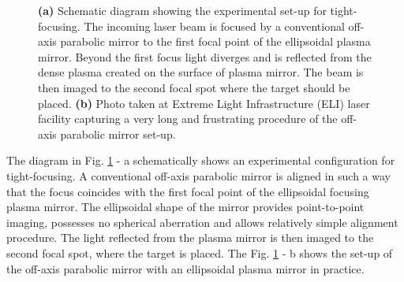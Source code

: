 \begin{figure}[h!]
	\centering
	\hspace{5mm}
	\caption{\textbf{(a)} Schematic diagram showing the experimental set-up for tight-focusing. The incoming laser beam is focused by a conventional off-axis parabolic mirror to the first focal point of the ellipsoidal plasma mirror. Beyond the first focus light diverges and is reflected from the dense plasma created on the surface of plasma mirror. The beam is then imaged to the second focal spot where the target should be placed. \textbf{(b)} Photo taken at Extreme Light Infrastructure (ELI) laser facility capturing a very long and frustrating procedure of the off-axis parabolic mirror set-up.}
	\label{fig:9}
\end{figure}

The diagram in Fig. \ref{fig:9} - a schematically shows an experimental configuration for tight-focusing. A conventional off-axis parabolic mirror is aligned in such a way that the focus coincides with the first focal point of the ellipsoidal focusing plasma mirror. The ellipsoidal shape of the mirror provides point-to-point imaging, possesses no spherical aberration and allows relatively simple alignment procedure. The light reflected from the plasma mirror is then imaged to the second focal spot, where the target is placed. The Fig. \ref{fig:9} - b shows the set-up of the off-axis parabolic mirror with an ellipsoidal plasma mirror in practice.